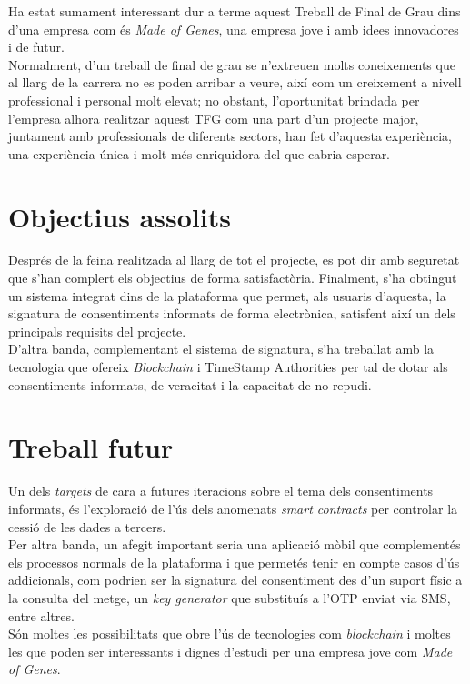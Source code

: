 Ha estat sumament interessant dur a terme aquest Treball de Final de Grau dins d'una empresa com és \textit{Made of Genes}, una empresa jove i amb idees innovadores i de futur.\\
\newline Normalment, d'un treball de final de grau se n'extreuen molts coneixements que al llarg de la carrera no es poden arribar a veure, així com un creixement a nivell professional i personal molt elevat; no obstant, l'oportunitat brindada per l'empresa alhora realitzar aquest TFG com una part d'un projecte major, juntament amb professionals de diferents sectors, han fet d'aquesta experiència, una experiència única i molt més enriquidora del que cabria esperar.
\section{Objectius assolits}
Després de la feina realitzada al llarg de tot el projecte, es pot dir amb seguretat que s'han complert els objectius de forma satisfactòria.
\newline Finalment, s'ha obtingut un sistema integrat dins de la plataforma que permet, als usuaris d'aquesta, la signatura de consentiments informats de forma electrònica, satisfent així un dels principals requisits del projecte.\\
\newline D'altra banda, complementant el sistema de signatura, s'ha treballat amb la tecnologia que ofereix \textit{Blockchain} i TimeStamp Authorities per tal de dotar als consentiments informats, de veracitat i la capacitat de no repudi.
\section{Treball futur}
Un dels \textit{targets} de cara a futures iteracions sobre el tema dels consentiments informats, és l'exploració de l'ús dels anomenats \textit{smart contracts} per controlar la cessió de les dades a tercers.\\
\newline Per altra banda, un afegit important seria una aplicació mòbil que complementés els processos normals de la plataforma i que permetés tenir en compte casos d'ús  addicionals, com podrien ser la signatura del consentiment des d'un suport físic a la consulta del metge, un \textit{key generator} que substituís a l'OTP enviat via SMS, entre altres.\\
\newline Són moltes les possibilitats que obre l'ús de tecnologies com \textit{blockchain} i moltes les que poden ser interessants i dignes d'estudi per una empresa jove com \textit{Made of Genes}.